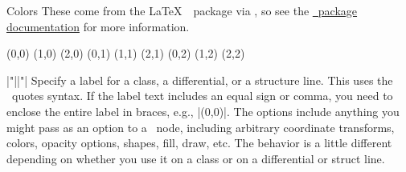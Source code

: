 \begin{sseqdata}[|| name = ex1, cohomological Serre grading]
\begin{manualentry}{Colors}
These come from the \LaTeX\  \  package via \tikzpkg, so see the \href{\colormanualurl}{\  package documentation} for more information.
\begin{codeexample}[width = 6cm]
\begin{sseqpage}[ classes = {fill,inner sep = 0.4em},
                  no axes, scale = 1.3 ]
\class[red](0,0)
\class[blue](1,0)
\class[green](2,0)
\class[cyan](0,1)
\class[magenta](1,1)
\class[yellow](2,1)
(0,2) %
(1,2) %
(2,2)
\end{sseqpage}
\end{codeexample}
\end{manualentry}

\begin{manualentry}{|"||"|}
Specify a label for a class, a differential, or a structure line. This uses the \tikzpkg\ quotes syntax. If the label text includes an equal sign or comma, you need to enclose the entire label in braces, e.g., |\class["{x = y}"](0,0)|. The options include anything you might pass as an option to a \tikzpkg\ node, including arbitrary coordinate transforms, colors, opacity options, shapes, fill, draw, etc. The behavior is a little different depending on whether you use it on a class or on a differential or struct line.


\end{manualentry}
\end{sseqdata}
